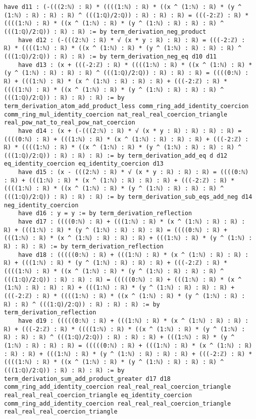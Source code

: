 \documentclass{article}
\begin{document}
\begin{tcolorbox}[colback=white!10, width=\linewidth]
\begin{lstlisting}[language=Lean4]
    have d11 : (-(((2:ℕ) : ℝ) * ((((1:ℕ) : ℝ) * ((x ^ (1:ℕ) : ℝ) * (y ^ (1:ℕ) : ℝ) : ℝ) : ℝ) ^ (((1:ℚ)/2:ℚ)) : ℝ) : ℝ) : ℝ) = (((-2:ℤ) : ℝ) * ((((1:ℕ) : ℝ) * ((x ^ (1:ℕ) : ℝ) * (y ^ (1:ℕ) : ℝ) : ℝ) : ℝ) ^ (((1:ℚ)/2:ℚ)) : ℝ) : ℝ) := by term_derivation_neg_product
    have d12 : (-(((2:ℕ) : ℝ) * √ (x * y : ℝ) : ℝ) : ℝ) = (((-2:ℤ) : ℝ) * ((((1:ℕ) : ℝ) * ((x ^ (1:ℕ) : ℝ) * (y ^ (1:ℕ) : ℝ) : ℝ) : ℝ) ^ (((1:ℚ)/2:ℚ)) : ℝ) : ℝ) := by term_derivation_neg_eq d10 d11
    have d13 : (x + (((-2:ℤ) : ℝ) * ((((1:ℕ) : ℝ) * ((x ^ (1:ℕ) : ℝ) * (y ^ (1:ℕ) : ℝ) : ℝ) : ℝ) ^ (((1:ℚ)/2:ℚ)) : ℝ) : ℝ) : ℝ) = ((((0:ℕ) : ℝ) + (((1:ℕ) : ℝ) * (x ^ (1:ℕ) : ℝ) : ℝ) : ℝ) + (((-2:ℤ) : ℝ) * ((((1:ℕ) : ℝ) * ((x ^ (1:ℕ) : ℝ) * (y ^ (1:ℕ) : ℝ) : ℝ) : ℝ) ^ (((1:ℚ)/2:ℚ)) : ℝ) : ℝ) : ℝ) := by term_derivation_atom_add_product_less comm_ring_add_identity_coercion comm_ring_mul_identity_coercion nat_real_real_coercion_triangle real_pow_nat_to_real_pow_nat_coercion
    have d14 : (x + (-(((2:ℕ) : ℝ) * √ (x * y : ℝ) : ℝ) : ℝ) : ℝ) = ((((0:ℕ) : ℝ) + (((1:ℕ) : ℝ) * (x ^ (1:ℕ) : ℝ) : ℝ) : ℝ) + (((-2:ℤ) : ℝ) * ((((1:ℕ) : ℝ) * ((x ^ (1:ℕ) : ℝ) * (y ^ (1:ℕ) : ℝ) : ℝ) : ℝ) ^ (((1:ℚ)/2:ℚ)) : ℝ) : ℝ) : ℝ) := by term_derivation_add_eq d d12 eq_identity_coercion eq_identity_coercion d13
    have d15 : (x - (((2:ℕ) : ℝ) * √ (x * y : ℝ) : ℝ) : ℝ) = ((((0:ℕ) : ℝ) + (((1:ℕ) : ℝ) * (x ^ (1:ℕ) : ℝ) : ℝ) : ℝ) + (((-2:ℤ) : ℝ) * ((((1:ℕ) : ℝ) * ((x ^ (1:ℕ) : ℝ) * (y ^ (1:ℕ) : ℝ) : ℝ) : ℝ) ^ (((1:ℚ)/2:ℚ)) : ℝ) : ℝ) : ℝ) := by term_derivation_sub_eqs_add_neg d14 neg_identity_coercion
    have d16 : y = y := by term_derivation_reflection
    have d17 : ((((0:ℕ) : ℝ) + (((1:ℕ) : ℝ) * (x ^ (1:ℕ) : ℝ) : ℝ) : ℝ) + (((1:ℕ) : ℝ) * (y ^ (1:ℕ) : ℝ) : ℝ) : ℝ) = ((((0:ℕ) : ℝ) + (((1:ℕ) : ℝ) * (x ^ (1:ℕ) : ℝ) : ℝ) : ℝ) + (((1:ℕ) : ℝ) * (y ^ (1:ℕ) : ℝ) : ℝ) : ℝ) := by term_derivation_reflection
    have d18 : (((((0:ℕ) : ℝ) + (((1:ℕ) : ℝ) * (x ^ (1:ℕ) : ℝ) : ℝ) : ℝ) + (((1:ℕ) : ℝ) * (y ^ (1:ℕ) : ℝ) : ℝ) : ℝ) + (((-2:ℤ) : ℝ) * ((((1:ℕ) : ℝ) * ((x ^ (1:ℕ) : ℝ) * (y ^ (1:ℕ) : ℝ) : ℝ) : ℝ) ^ (((1:ℚ)/2:ℚ)) : ℝ) : ℝ) : ℝ) = (((((0:ℕ) : ℝ) + (((1:ℕ) : ℝ) * (x ^ (1:ℕ) : ℝ) : ℝ) : ℝ) + (((1:ℕ) : ℝ) * (y ^ (1:ℕ) : ℝ) : ℝ) : ℝ) + (((-2:ℤ) : ℝ) * ((((1:ℕ) : ℝ) * ((x ^ (1:ℕ) : ℝ) * (y ^ (1:ℕ) : ℝ) : ℝ) : ℝ) ^ (((1:ℚ)/2:ℚ)) : ℝ) : ℝ) : ℝ) := by term_derivation_reflection
    have d19 : (((((0:ℕ) : ℝ) + (((1:ℕ) : ℝ) * (x ^ (1:ℕ) : ℝ) : ℝ) : ℝ) + (((-2:ℤ) : ℝ) * ((((1:ℕ) : ℝ) * ((x ^ (1:ℕ) : ℝ) * (y ^ (1:ℕ) : ℝ) : ℝ) : ℝ) ^ (((1:ℚ)/2:ℚ)) : ℝ) : ℝ) : ℝ) + (((1:ℕ) : ℝ) * (y ^ (1:ℕ) : ℝ) : ℝ) : ℝ) = (((((0:ℕ) : ℝ) + (((1:ℕ) : ℝ) * (x ^ (1:ℕ) : ℝ) : ℝ) : ℝ) + (((1:ℕ) : ℝ) * (y ^ (1:ℕ) : ℝ) : ℝ) : ℝ) + (((-2:ℤ) : ℝ) * ((((1:ℕ) : ℝ) * ((x ^ (1:ℕ) : ℝ) * (y ^ (1:ℕ) : ℝ) : ℝ) : ℝ) ^ (((1:ℚ)/2:ℚ)) : ℝ) : ℝ) : ℝ) := by term_derivation_sum_add_product_greater d17 d18 comm_ring_add_identity_coercion real_real_real_coercion_triangle real_real_real_coercion_triangle eq_identity_coercion comm_ring_add_identity_coercion real_real_real_coercion_triangle real_real_real_coercion_triangle

\end{lstlisting}
\end{tcolorbox}
\end{document}
